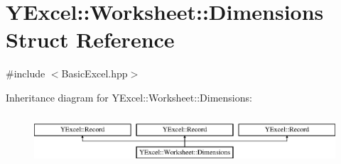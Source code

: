 \hypertarget{struct_y_excel_1_1_worksheet_1_1_dimensions}{}\section{Y\+Excel\+:\+:Worksheet\+:\+:Dimensions Struct Reference}
\label{struct_y_excel_1_1_worksheet_1_1_dimensions}


{\ttfamily \#include $<$Basic\+Excel.\+hpp$>$}

Inheritance diagram for Y\+Excel\+:\+:Worksheet\+:\+:Dimensions\+:\begin{figure}[H]
\begin{center}
\leavevmode
\includegraphics[height=1.914530cm]{struct_y_excel_1_1_worksheet_1_1_dimensions}
\end{center}
\end{figure}
